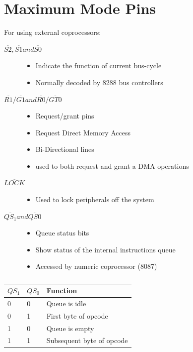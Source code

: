 \section{Maximum Mode Pins}
For using external coprocessors:
\begin{description}

    \item[$\overline{S2} , \overline{S1} and \overline{S0} $]
    \begin{itemize}
        \item Indicate the function of current bus-cycle
        \item Normally decoded by 8288 bus controllers
    \end{itemize}

    \item[$\overline{R1} / \overline{G1} and \overline{R0} / \overline{GT0} $]
    \begin{itemize}
        \item Request/grant pins
        \item Request Direct Memory Access
        \item Bi-Directional lines
        \item used to both request and grant a DMA operations
    \end{itemize}

    \item[$\overline{LOCK} $]
    \begin{itemize}
        \item Used to lock peripherals off the system
    \end{itemize}

    \item[$\overline{QS_1}  and \overline{QS0} $]
    \begin{itemize}
        \item Queue status bits
        \item Show status of the internal instructions queue
        \item Accessed by numeric coprocessor (8087)
    \end{itemize}

\end{description}

\begin{table}[h!]
\centering
\begin{tabular}{ |p{1cm}|p{1cm}|p{3cm}|  }
\hline
$ \overline{QS_1} $ & $ \overline{QS_0} $  & Function   \\
\hline
0 & 0 & Queue is idle \\
0 & 1 & First byte of opcode \\
1 & 0 & Queue is empty\\
1 & 1 & Subsequent byte of opcode \\
\hline
\end{tabular}

\caption{}
\label{table:4}
\end{table}

